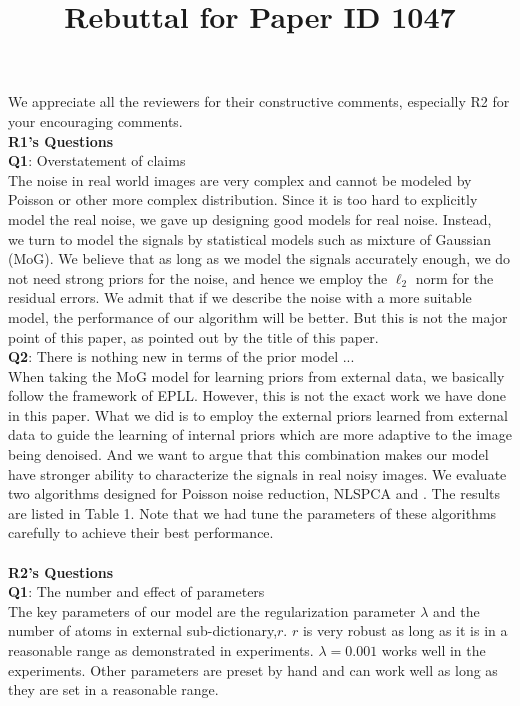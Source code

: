 \documentclass[10pt,twocolumn,letterpaper]{article}
\begin{document}
\title{Rebuttal for Paper ID 1047}  %

\maketitle
\thispagestyle{empty}



We appreciate all the reviewers for their constructive comments, especially R2 for your encouraging comments.
\\
\textbf{R1's Questions}
\\
\textbf{Q1}: Overstatement of claims
\\
The noise in real world images are very complex and cannot be modeled by Poisson or other more complex distribution. Since it is too hard to explicitly model the real noise, we gave up designing good models for real noise. Instead, we turn to model the signals by statistical models such as mixture of Gaussian (MoG). We believe that as long as we model the signals accurately enough, we do not need strong priors for the noise, and hence we employ the $\ell_{2}$ norm for the residual errors. We admit that if we describe the noise with a more suitable model, the performance of our algorithm will be better. But this is not the major point of this paper, as pointed out by the title of this paper.
\\
\textbf{Q2}: There is nothing new in terms of the prior model ...
\\
When taking the MoG model for learning priors from external data, we basically follow the framework of EPLL. However, this is not the exact work we have done in this paper. What we did is to employ the external priors learned from external data to guide the learning of internal priors which are more adaptive to the image being denoised. And we want to argue that this combination makes our model have stronger ability to characterize the signals in real noisy images. We evaluate two algorithms designed for Poisson noise reduction, NLSPCA \cite{nlpca} and \cite{makitalo2013optimal}. The results are listed in Table 1. Note that we had tune the parameters of these algorithms carefully to achieve their best performance.
\\
\\
\textbf{R2's Questions}
\\
\textbf{Q1}: The number and effect of parameters
\\
The key parameters of our model are the regularization parameter $\lambda$ and the number of atoms in external sub-dictionary,$r$. $r$ is very robust as long as it is in a reasonable range as demonstrated in experiments. $\lambda=0.001$ works well in the experiments. Other parameters are preset by hand and can work well as long as they are set in a reasonable range.
\end{document}
